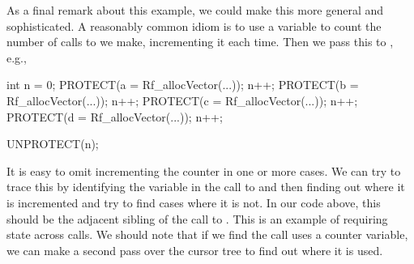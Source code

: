 \begin{comment}
f = system.file("exampleCode", "protectCorrect.c", package = "RCIndex")
r = getRoutines(f, f, includes = sprintf("%
v = genProtectAnalyzer()
visitCursor(r$R_foo, v$update)
v$info()
\end{comment}



As a final remark about this example, we could make this more general
and sophisticated.  A reasonably common idiom is to use a variable to
count the number of calls to  we make, incrementing it
each time. Then we pass this to , e.g.,
\begin{CCode}
 int n = 0;
 PROTECT(a = Rf_allocVector(...)); n++;
 PROTECT(b = Rf_allocVector(...)); n++;
 PROTECT(c = Rf_allocVector(...)); n++;
 PROTECT(d = Rf_allocVector(...)); n++;

 UNPROTECT(n);
\end{CCode}
It is easy to omit incrementing the counter in one or more cases. We
can try to trace this by identifying the variable in the call to
 and then finding out where it is incremented and try
to find cases where it is not.  In our code above, this should be the
adjacent sibling of the call to . This is an example of
requiring state across calls.  We should note that if we find the
 call uses a counter variable, we can make a second pass over the
cursor tree to find out where it is used.


